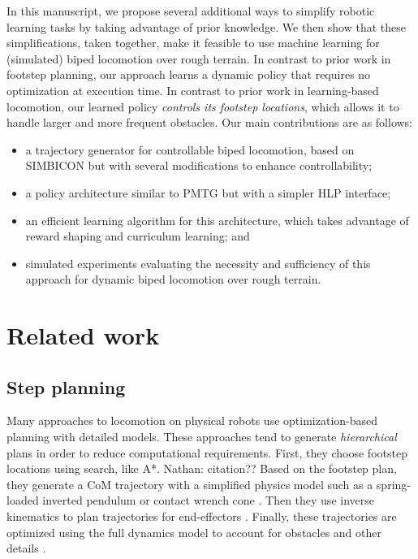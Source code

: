 \documentclass[a4paper]{article}
\newcommand{\nhatch}[1]{{\leavevmode\color{magenta} Nathan: #1}}
\begin{document}
In this manuscript, we propose several additional ways to simplify robotic learning tasks by taking advantage of prior knowledge.
We then show that these simplifications, taken together, make it feasible to use machine learning for (simulated) biped locomotion over rough terrain.
In contrast to prior work in footstep planning, our approach learns a dynamic policy that requires no optimization at execution time.
In contrast to prior work in learning-based locomotion, our learned policy \emph{controls its footstep locations}, which allows it to handle larger and more frequent obstacles.
Our main contributions are as follows:
\begin{itemize}
  \item a trajectory generator for controllable biped locomotion, based on SIMBICON \citep{yin2007simbicon} but with several modifications to enhance controllability;
  \item a policy architecture similar to PMTG but with a simpler HLP interface;
  \item an efficient learning algorithm for this architecture, which takes advantage of reward shaping and curriculum learning; and
  \item simulated experiments evaluating the necessity and sufficiency of this approach for dynamic biped locomotion over rough terrain.
\end{itemize}

\section{Related work}

\subsection{Step planning}

Many approaches to locomotion on physical robots use optimization-based planning with detailed models.
These approaches tend to generate \emph{hierarchical} plans in order to reduce computational requirements.
First, they choose footstep locations using search, like A*.\nhatch{citation??}
Based on the footstep plan, they generate a CoM trajectory with a simplified physics model such as a spring-loaded inverted pendulum \citep{mordatch2010robust} or contact wrench cone \citep{dai2016planning}.
Then they use inverse kinematics to plan trajectories for end-effectors \citep{zucker2010optimization}.
Finally, these trajectories are optimized using the full dynamics model to account for obstacles and other details \citep{ratliff2009chomp}.
\end{document}
